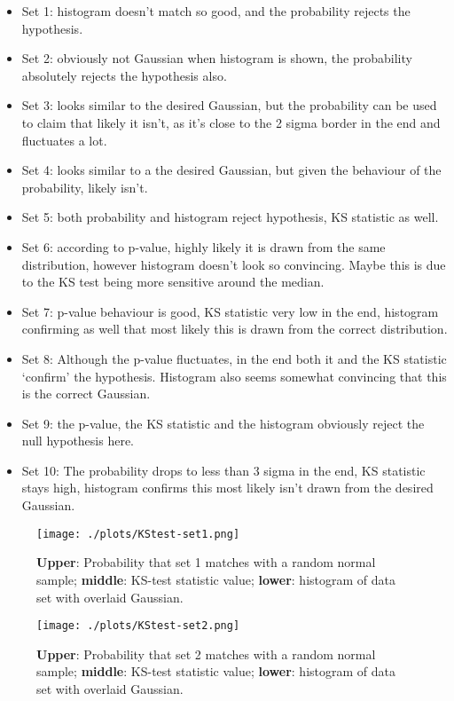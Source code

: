 \documentclass{article}
\begin{document}
\begin{itemize}
    \item Set 1: histogram doesn't match so good, and the probability rejects the hypothesis.
    \item Set 2: obviously not Gaussian when histogram is shown, the probability absolutely rejects the hypothesis also.
    \item Set 3: looks similar to the desired Gaussian, but the probability can be used to claim that likely it isn't, as it's close to the 2 sigma border in the end and fluctuates a lot.
    \item Set 4: looks similar to a the desired Gaussian, but given the behaviour of the probability, likely isn't.
    \item Set 5: both probability and histogram reject hypothesis, KS statistic as well.
    \item Set 6: according to p-value, highly likely it is drawn from the same distribution, however histogram doesn't look so convincing. Maybe this is due to the KS test being more sensitive around the median.
    \item Set 7: p-value behaviour is good, KS statistic very low in the end, histogram confirming as well that most likely this is drawn from the correct distribution.
    \item Set 8: Although the p-value fluctuates, in the end both it and the KS statistic `confirm' the hypothesis. Histogram also seems somewhat convincing that this is the correct Gaussian.
    \item Set 9: the p-value, the KS statistic and the histogram obviously reject the null hypothesis here.
    \item Set 10: The probability drops to less than 3 sigma in the end, KS statistic stays high, histogram confirms this most likely isn't drawn from the desired Gaussian.
\end{itemize}

\begin{figure}[!h]
\centering
\begin{minipage}[t]{7.6cm}
    \centering
    \texttt{[image: ./plots/KStest-set1.png]}
    \caption{\textbf{Upper}: Probability that set 1 matches with a random normal sample; \textbf{middle}: KS-test statistic value; \textbf{lower}: histogram of data set with overlaid Gaussian.}
    \label{fig:KS-1}
\end{minipage}%
\qquad
\begin{minipage}[t]{7.6cm}
    \centering
    \texttt{[image: ./plots/KStest-set2.png]}
    \caption{\textbf{Upper}: Probability that set 2 matches with a random normal sample; \textbf{middle}: KS-test statistic value; \textbf{lower}: histogram of data set with overlaid Gaussian.}
    \label{fig:KS-2}
\end{minipage}%
\end{figure}
\end{document}
